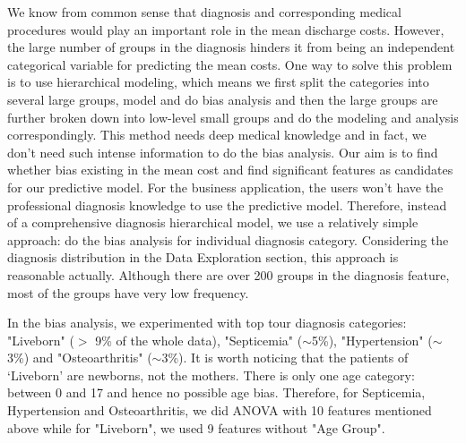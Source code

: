 \documentclass[10pt,twocolumn,letterpaper]{article}
\begin{document}
We know from common sense that diagnosis and corresponding medical procedures would play an important role in the mean discharge costs. However, the large number of groups in the diagnosis hinders it from being an independent categorical variable for predicting the mean costs. One way to solve this problem is to use hierarchical modeling, which means we first split the categories into several large groups, model and do bias analysis and then the large groups are further broken down into low-level small groups and do the modeling and analysis correspondingly. This method needs deep medical knowledge and in fact, we don't need such intense information to do the bias analysis. Our aim is to find whether bias existing in the mean cost and find significant features as candidates for our predictive model. For the business application, the users won't have the professional diagnosis knowledge to use the predictive model.  Therefore, instead of a comprehensive diagnosis hierarchical model, we use a relatively simple approach: do the bias analysis for individual diagnosis category. Considering the diagnosis distribution in the Data Exploration section, this approach is reasonable actually. Although there are over 200 groups in the diagnosis feature, most of the groups have very low frequency.

In the bias analysis, we experimented with top tour diagnosis categories: "Liveborn" ($>$ 9\% of the whole data), "Septicemia" ($\sim$5\%), "Hypertension" ($\sim$3\%) and "Osteoarthritis" ($\sim$3\%).  It is worth noticing that the patients of `Liveborn' are newborns, not the mothers. There is only one age category: between 0 and 17 and hence no possible age bias. Therefore, for Septicemia, Hypertension and Osteoarthritis, we did ANOVA with 10 features mentioned above while for "Liveborn", we used 9 features without "Age Group". 
\end{document}

